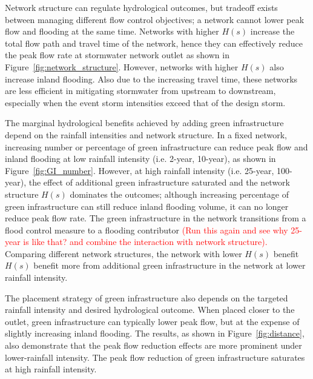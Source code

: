 \documentclass[draft]{agujournal2019}
\begin{document}
Network structure can regulate hydrological outcomes, but tradeoff exists between managing different flow control objectives; a network cannot lower peak flow and flooding at the same time. Networks with higher $H(s)$ increase the total flow path and travel time of the network, hence they can effectively reduce the peak flow rate at stormwater network outlet as shown in Figure~\ref{fig:network_structure}. However, networks with higher $H(s)$ also increase inland flooding. Also due to the increasing travel time, these networks are less efficient in mitigating stormwater from upstream to downstream, especially when the event storm intensities exceed that of the design storm. 

The marginal hydrological benefits achieved by adding green infrastructure depend on the rainfall intensities and network structure. In a fixed network, increasing number or percentage of green infrastructure can reduce peak flow and inland flooding at low rainfall intensity (i.e. 2-year, 10-year), as shown in Figure~\ref{fig:GI_number}. However, at high rainfall intensity (i.e. 25-year, 100-year), the effect of additional green infrastructure saturated and the network structure $H(s)$ dominates the outcomes; although increasing percentage of green infrastructure can still reduce inland flooding volume, it can no longer reduce peak flow rate. The green infrastructure in the network transitions from a flood control measure to a flooding contributor \textcolor{red}{(Run this again and see why 25-year is like that? and combine the interaction with network structure).} Comparing different network structures, the network with lower $H(s)$ benefit $H(s)$ benefit more from additional green infrastructure in the network at lower rainfall intensity. 

The placement strategy of green infrastructure also depends on the targeted rainfall intensity and desired hydrological outcome. When placed closer to the outlet, green infrastructure can typically lower peak flow, but at the expense of slightly increasing inland flooding. The results, as shown in Figure~\ref{fig:distance}, also demonstrate that the peak flow reduction effects are more prominent under lower-rainfall intensity. The peak flow reduction of green infrastructure saturates at high rainfall intensity. 
\end{document}
